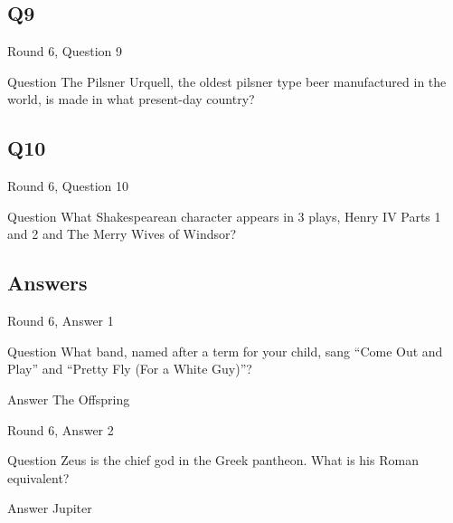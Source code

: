 \documentclass[11pt]{beamer}
\begin{document}
\subsection*{Q9}
\begin{frame}[t]{Round 6, Question 9}
\vspace{2em}
\begin{block}{Question}
The Pilsner Urquell, the oldest pilsner type beer manufactured in the world, is made in what present-day country\@?
\end{block}
\end{frame}
    

\subsection*{Q10}
\begin{frame}[t]{Round 6, Question 10}
\vspace{2em}
\begin{block}{Question}
What Shakespearean character appears in 3 plays, Henry IV Parts 1 and 2 and The Merry Wives of Windsor\@?
\end{block}
\end{frame}
    
\subsection{Answers}

\begin{frame}[t]{Round 6, Answer 1}
\vspace{2em}
\begin{block}{Question}
What band, named after a term for your child, sang ``Come Out and Play'' and ``Pretty Fly (For a White Guy)''\@?
\end{block}
\pause{}
\begin{block}{Answer}
The Offspring
\end{block}
\end{frame}
    

\begin{frame}[t]{Round 6, Answer 2}
\vspace{2em}
\begin{block}{Question}
Zeus is the chief god in the Greek pantheon. What is his Roman equivalent\@?
\end{block}
\pause{}
\begin{block}{Answer}
Jupiter
\end{block}
\end{frame}
    
\end{document}

